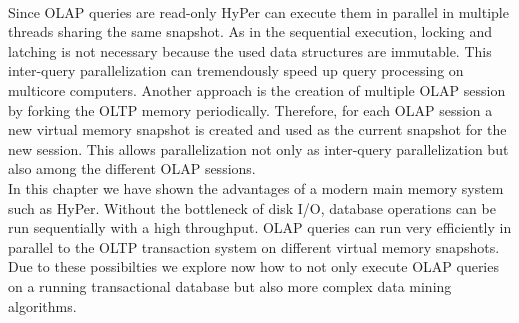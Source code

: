 \\
Since OLAP queries are read-only HyPer can execute them in parallel in multiple threads sharing the same snapshot. As in the sequential execution, locking and latching is not necessary because the used data structures are immutable. This inter-query parallelization can tremendously speed up query processing on multicore computers. Another approach is the creation of multiple OLAP session by forking the OLTP memory periodically. Therefore, for each OLAP session a new virtual memory snapshot is created and used as the current snapshot for the new session. This allows parallelization not only as inter-query parallelization but also among the different OLAP sessions.
\\ 
In this chapter we have shown the advantages of a modern main memory system such as HyPer. Without the bottleneck of disk I/O, database operations can be run sequentially with a high throughput. OLAP queries can run very efficiently in parallel to the OLTP transaction system on different virtual memory snapshots. Due to these possibilties we explore now how to not only execute OLAP queries on a running transactional database but also more complex data mining algorithms.


